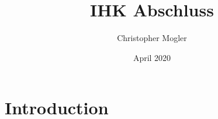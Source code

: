 \documentclass{article}
\title{IHK Abschluss}
\author{Christopher Mogler}
\date{April 2020}
\begin{document}
\maketitle

\section{Introduction}
\end{document}
